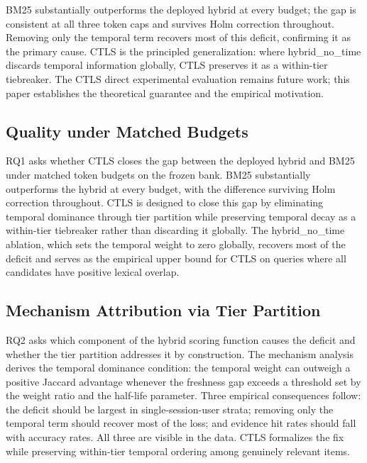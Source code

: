 BM25 substantially outperforms the deployed hybrid at every budget; the gap is consistent at all three token caps and survives Holm correction throughout. Removing only the temporal term recovers most of this deficit, confirming it as the primary cause. CTLS is the principled generalization: where hybrid\_no\_time discards temporal information globally, CTLS preserves it as a within-tier tiebreaker. The CTLS direct experimental evaluation remains future work; this paper establishes the theoretical guarantee and the empirical motivation.

\subsection{Quality under Matched Budgets}

\label{sec:rq_quality}

RQ1 asks whether CTLS closes the gap between the deployed hybrid and BM25 under matched token budgets on the frozen bank. BM25 substantially outperforms the hybrid at every budget, with the difference surviving Holm correction throughout. CTLS is designed to close this gap by eliminating temporal dominance through tier partition while preserving temporal decay as a within-tier tiebreaker rather than discarding it globally. The hybrid\_no\_time ablation, which sets the temporal weight to zero globally, recovers most of the deficit and serves as the empirical upper bound for CTLS on queries where all candidates have positive lexical overlap.

\subsection{Mechanism Attribution via Tier Partition}

\label{sec:rq_attribution}

RQ2 asks which component of the hybrid scoring function causes the deficit and whether the tier partition addresses it by construction. The mechanism analysis derives the temporal dominance condition: the temporal weight can outweigh a positive Jaccard advantage whenever the freshness gap exceeds a threshold set by the weight ratio and the half-life parameter. Three empirical consequences follow: the deficit should be largest in single-session-user strata; removing only the temporal term should recover most of the loss; and evidence hit rates should fall with accuracy rates. All three are visible in the data. CTLS formalizes the fix while preserving within-tier temporal ordering among genuinely relevant items.

